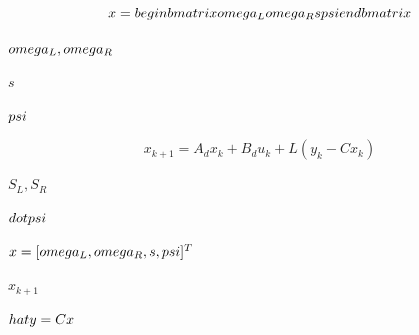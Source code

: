 \documentclass{article}
\begin{document}
\[x = \\begin{bmatrix}
\\omega_L \\\\
\\omega_R \\\\
s \\\\
\\psi
\\end{bmatrix}
\]
\pagebreak

$ \\omega_L, \\omega_R $
\pagebreak

$ s $
\pagebreak

$ \\psi $
\pagebreak

\[x_{k+1} = A_d x_k + B_d u_k + L (y_k - C x_k)
\]
\pagebreak

$ S_L, S_R $
\pagebreak

$ \\dot{\\psi} $
\pagebreak

$ x = [\\omega_L, \\omega_R, s, \\psi]^T $
\pagebreak

$ x_{k+1} $
\pagebreak

$ \\hat{y} = C x $
\pagebreak
\end{document}
